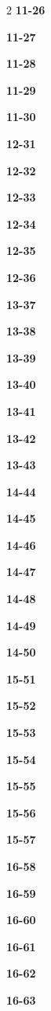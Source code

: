 \documentclass[10pt,a4paper]{article}
\begin{document}
\begin{multicols}{2}
\noindent\textbf{11-26}\ \par
\noindent\textbf{11-27}\ \par
\noindent\textbf{11-28}\ \par
\noindent\textbf{11-29}\ \par
\noindent\textbf{11-30}\ \par
\noindent\textbf{12-31}\ \par
\noindent\textbf{12-32}\ \par
\noindent\textbf{12-33}\ \par
\noindent\textbf{12-34}\ \par
\noindent\textbf{12-35}\ \par
\noindent\textbf{12-36}\ \par
\noindent\textbf{13-37}\ \par
\noindent\textbf{13-38}\ \par
\noindent\textbf{13-39}\ \par
\noindent\textbf{13-40}\ \par
\noindent\textbf{13-41}\ \par
\noindent\textbf{13-42}\ \par
\noindent\textbf{13-43}\ \par
\noindent\textbf{14-44}\ \par
\noindent\textbf{14-45}\ \par
\noindent\textbf{14-46}\ \par
\noindent\textbf{14-47}\ \par
\noindent\textbf{14-48}\ \par
\noindent\textbf{14-49}\ \par
\noindent\textbf{14-50}\ \par
\noindent\textbf{15-51}\ \par
\noindent\textbf{15-52}\ \par
\noindent\textbf{15-53}\ \par
\noindent\textbf{15-54}\ \par
\noindent\textbf{15-55}\ \par
\noindent\textbf{15-56}\ \par
\noindent\textbf{15-57}\ \par
\noindent\textbf{16-58}\ \par
\noindent\textbf{16-59}\ \par
\noindent\textbf{16-60}\ \par
\noindent\textbf{16-61}\ \par
\noindent\textbf{16-62}\ \par
\noindent\textbf{16-63}\ \par

\end{multicols}
\end{document}
